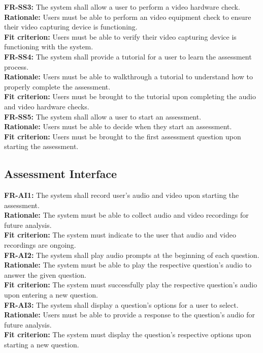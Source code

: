 \documentclass[12pt]{article}
\begin{document}
\textbf{FR-SS3: }The system shall allow a user to perform a video hardware check.\\
\textbf{Rationale: }Users must be able to perform an video equipment check to ensure their video capturing device is functioning.\\
\textbf{Fit criterion: }Users must be able to verify their video capturing device is functioning with the system.\\

\textbf{FR-SS4: }The system shall provide a tutorial for a user to learn the assessment process.\\
\textbf{Rationale: }Users must be able to walkthrough a tutorial to understand how to properly complete the assessment.\\
\textbf{Fit criterion: }Users must be brought to the tutorial upon completing the audio and video hardware checks.\\

\textbf{FR-SS5: }The system shall allow a user to start an assessment.\\
\textbf{Rationale: }Users must be able to decide when they start an assessment.\\
\textbf{Fit criterion: }Users must be brought to the first assessment question upon starting the assessment.\\

\subsection{Assessment Interface}
\textbf{FR-AI1: }The system shall record user's audio and video upon starting the assessment.\\
\textbf{Rationale: }The system must be able to collect audio and video recordings for future analysis.\\
\textbf{Fit criterion: }The system must indicate to the user that audio and video recordings are ongoing.\\

\textbf{FR-AI2: }The system shall play audio prompts at the beginning of each question.\\
\textbf{Rationale: }The system must be able to play the respective question's audio to answer the given question.\\
\textbf{Fit criterion: }The system must successfully play the respective question's audio upon entering a new question.\\

\textbf{FR-AI3: }The system shall display a question's options for a user to select.\\
\textbf{Rationale: }Users must be able to provide a response to the question's audio for future analysis.\\
\textbf{Fit criterion: }The system must display the question's respective options upon starting a new question.\\
\end{document}
